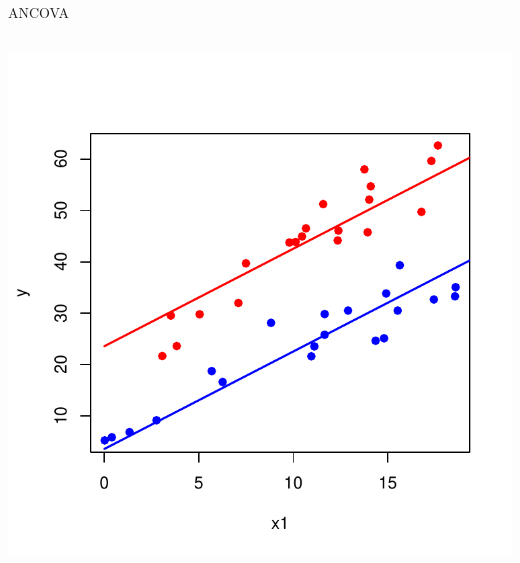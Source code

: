 \documentclass{beamer}\usepackage[]{graphicx}\usepackage[]{color}
\newenvironment{knitrout}{}{} %
\renewenvironment{knitrout}{\setlength{\topsep}{0mm}}{}
\begin{document}
\begin{frame}[fragile]{ANCOVA}
\begin{columns}

\begin{knitrout}
\color{fgcolor}
\includegraphics[width=1.1\linewidth]{figure/ancovplot1-1} 

\end{knitrout}


\end{columns}

\end{frame}
\end{document}
